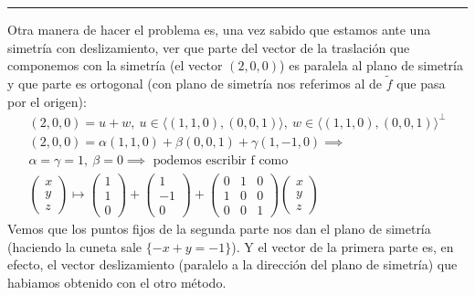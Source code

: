 \documentclass[14pt]{book}
\begin{document}
\begin{ej}
	
	\hrule
	
	Otra manera de hacer el problema es, una vez sabido que estamos ante una simetría con deslizamiento, ver que parte del vector de la traslación que componemos con la simetría (el vector $(2,0,0)$) es paralela al plano de simetría y que parte es ortogonal (con plano de simetría nos referimos al de $\tilde{f}$ que pasa por el origen):
	\begin{align*}
		(2,0,0) = u + w,\ u \in \langle (1,1,0), (0,0,1)\rangle,\ w \in \langle (1,1,0), (0,0,1)\rangle^\perp \\(2,0,0) = \alpha (1,1,0) + \beta(0,0,1) + \gamma (1, -1, 0) \implies\\
		\alpha = \gamma = 1,\ \beta = 0 \implies \text{ podemos escribir f como} \\
		\left(\begin{array}{c}
		x \\ y \\ z
		\end{array}\right) \mapsto
		\left(\begin{array}{c}
		1 \\ 1 \\ 0
		\end{array}\right) +
		\left(\begin{array}{c}
		1 \\ -1 \\ 0
		\end{array}\right) + 
		\left(\begin{array}{ccc}
		0 & 1 & 0 \\
		1 & 0 & 0 \\
		0 & 0 & 1
		\end{array}\right)\left(\begin{array}{c}
		x \\ y \\ z
		\end{array}\right)
	\end{align*}
	Vemos que los puntos fijos de la segunda parte nos dan el plano de simetría (haciendo la cuneta sale $\{-x + y = -1\}$). Y el vector de la primera parte es, en efecto, el vector deslizamiento (paralelo a la dirección del plano de simetría) que habiamos obtenido con el otro método.
\end{ej}
\end{document}
